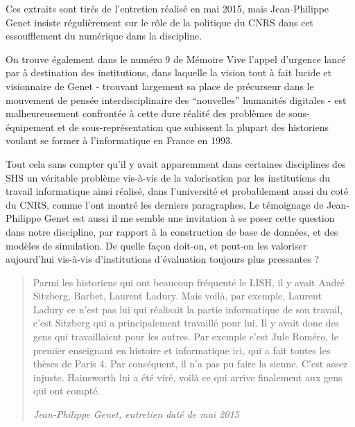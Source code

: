 Ces extraits sont tirés de l'entretien réalisé en mai 2015, mais Jean-Philippe Genet insiste régulièrement sur le rôle de la politique du CNRS dans cet essoufflement du numérique dans la discipline.

On trouve également dans le numéro 9 de Mémoire Vive l'appel d'urgence lancé par \textcite{Genet1993} à destination des institutions, dans laquelle la vision tout à fait lucide et visionnaire de Genet - trouvant largement sa place de précurseur dans le mouvement de pensée interdisciplinaire des \enquote{nouvelles} humanités digitales - est malheureusement confrontée à cette dure réalité des problèmes de sous-équipement et de sous-représentation que subissent la plupart des historiens voulant se former à l'informatique en France en 1993.

Tout cela sans compter qu'il y avait apparemment dans certaines disciplines des SHS un véritable problème vis-à-vis de la valorisation par les institutions du travail informatique ainsi réalisé, dans l'université et probablement aussi du coté du CNRS, comme l'ont montré les derniers paragraphes. Le témoignage de Jean-Philippe Genet est aussi il me semble une invitation à se poser cette question dans notre discipline, par rapport à la construction de base de données, et des modèles de simulation. De quelle façon doit-on, et peut-on les valoriser aujourd'hui vis-à-vis d'institutions d'évaluation toujours plus pressantes ?

\blockquote[\textit{Jean-Philippe Genet, entretien daté de mai 2015}]{Parmi les historiens qui ont beaucoup fréquenté le LISH, il y avait André Sitzberg, Barbet, Laurent Ladury. Mais voilà, par exemple, Laurent Ladury ce n'est pas lui qui réalisait la partie informatique de son travail, c'est Sitzberg qui a principalement travaillé pour lui. Il y avait donc des gens qui travaillaient pour les autres. Par exemple c'est Jule Roméro, le premier enseignant en histoire et informatique ici, qui a fait toutes les thèses de Paris 4. Par conséquent, il n'a pas pu faire la sienne. C'est assez injuste. Hainsworth lui a été viré, voilà ce qui arrive finalement aux gens qui ont compté.}

